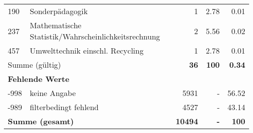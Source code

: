 \begin{longtable}{lXrrr}
        190 & \multicolumn{1}{X}{Sonderpädagogik} & %
          \num{1} &
          \num[round-mode=places,round-precision=2]{2,78} &
          \num[round-mode=places,round-precision=2]{0,01} \\

        237 & \multicolumn{1}{X}{Mathematische Statistik/Wahrscheinlichkeitsrechnung} & %
          \num{2} &
          \num[round-mode=places,round-precision=2]{5,56} &
          \num[round-mode=places,round-precision=2]{0,02} \\

        457 & \multicolumn{1}{X}{Umwelttechnik einschl. Recycling} & %
          \num{1} &
          \num[round-mode=places,round-precision=2]{2,78} &
          \num[round-mode=places,round-precision=2]{0,01} \\

     \midrule
     \multicolumn{2}{l}{Summe (gültig)} &
       \textbf{\num{36}} &
     \textbf{100} &
       \textbf{\num[round-mode=places,round-precision=2]{0,34}} \\
     \multicolumn{5}{l}{\textbf{Fehlende Werte}}\\
       -998 &
       keine Angabe &
         \num{5931} &
        - &
         \num[round-mode=places,round-precision=2]{56,52} \\
       -989 &
       filterbedingt fehlend &
         \num{4527} &
        - &
         \num[round-mode=places,round-precision=2]{43,14} \\
     \midrule
     \multicolumn{2}{l}{\textbf{Summe (gesamt)}} &
          \textbf{\num{10494}} &
        \textbf{-} &
        \textbf{100} \\
     \bottomrule
     \end{longtable}
     
